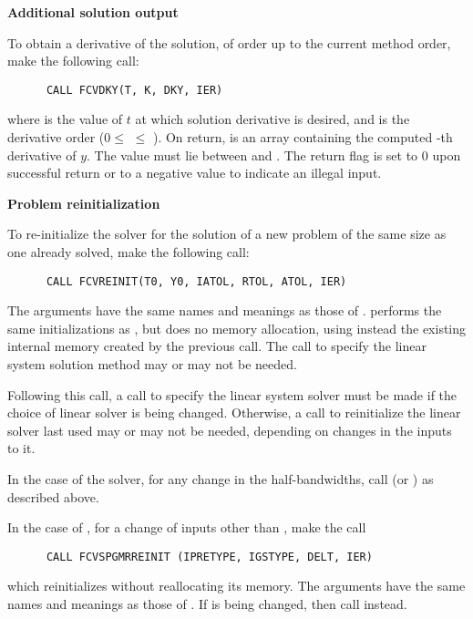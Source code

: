 \begin{Steps}
\item {\bf Additional solution output}

  To obtain a derivative of the solution, of order up to the current method
  order, make the following call:
\begin{verbatim}
      CALL FCVDKY(T, K, DKY, IER)
\end{verbatim}
  where
   is the value of $t$ at which solution derivative is desired, and
   is the derivative order ($0 \le$  $\le$ ).
  On return,  is an array containing the computed -th derivative
  of $y$.  The value  must lie between  and .
  The return flag  is set to $0$ upon successful return or to a negative
  value to indicate an illegal input.
  
\item {\bf Problem reinitialization}

  To re-initialize the {\cvode} solver for the solution of a new problem
  of the same size as one already solved, make the following call:
\begin{verbatim}
      CALL FCVREINIT(T0, Y0, IATOL, RTOL, ATOL, IER)
\end{verbatim}
  The arguments have the same names and meanings as those of .
   performs the same initializations as
  , but does no memory allocation, using instead the existing
  internal memory created by the previous  call.  The call to
  specify the linear system solution method may or may not be needed.

  Following this call, a call to specify the linear system solver must be
  made if the choice of linear solver is being changed.  Otherwise, a call
  to reinitialize the linear solver last used may or may not be needed,
  depending on changes in the inputs to it.

  In the case of the {\band} solver, for any change in the half-bandwidths,
  call  (or ) as described above.

  In the case of {\spgmr}, for a change of inputs other than ,
  make the call
\begin{verbatim}
      CALL FCVSPGMRREINIT (IPRETYPE, IGSTYPE, DELT, IER)
\end{verbatim}
  which reinitializes {\spgmr} without reallocating its memory.
  The arguments have the same names and meanings as those of .
  If  is being changed, then call  instead.


\end{Steps}
